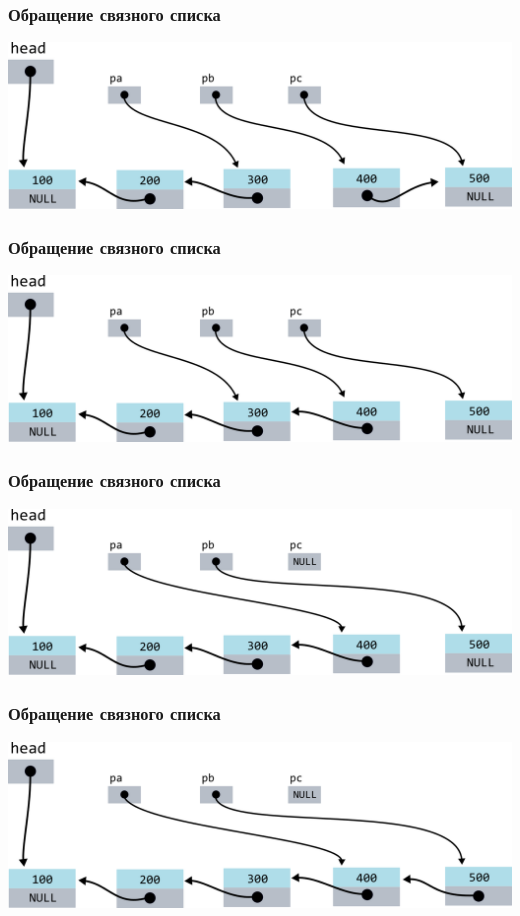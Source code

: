 \documentclass[10pt,pdf,hyperref={unicode}]{beamer}
\begin{document}
\begin{frame}[fragile]
\frametitle{Обращение связного списка}
\begin{center}
\includegraphics[width=\imageSizeMult\linewidth]{../images/reverse_list/reverse_list7.png}
\end{center}
\end{frame}

\begin{frame}[fragile]
\frametitle{Обращение связного списка}
\begin{center}
\includegraphics[width=\imageSizeMult\linewidth]{../images/reverse_list/reverse_list8.png}
\end{center}
\end{frame}

\begin{frame}[fragile]
\frametitle{Обращение связного списка}
\begin{center}
\includegraphics[width=\imageSizeMult\linewidth]{../images/reverse_list/reverse_list9.png}
\end{center}
\end{frame}

\begin{frame}[fragile]
\frametitle{Обращение связного списка}
\begin{center}
\includegraphics[width=\imageSizeMult\linewidth]{../images/reverse_list/reverse_list10.png}
\end{center}
\end{frame}
\end{document}
